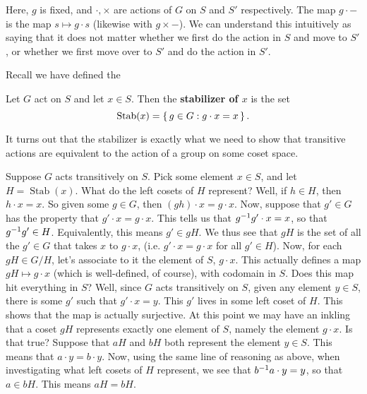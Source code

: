 \documentclass[./main.tex]{subfiles}
\begin{document}
Here, $g$ is fixed, and $\cdot, \times$ are actions of $G$ on $S$ and $S'$
respectively. The map $g \cdot -$ is the map $s \mapsto g \cdot s$ (likewise
with $g \times -$). We can understand this intuitively as saying that it does
not matter whether we first do the action in $S$ and move to $S'$, or whether we
first move over to $S'$ and do the action in $S'$.

Recall we have defined the
\begin{definition}
    Let $G$ act on $S$ and let $x \in S$. Then the \textbf{stabilizer of $x$} is the set 
    \[
        \operatorname{Stab}(x) = \set{ g \in G: g \cdot x = x}.
    \]
\end{definition}
It turns out that the stabilizer is exactly what we need to show that transitive
actions are equivalent to the action of a group on some coset space.

Suppose $G$ acts transitively on $S$. Pick some element $x \in S$, and let $H =
\operatorname{Stab}(x)$. What do the left cosets of $H$ represent? Well, if $h
\in H$, then $h \cdot x = x$. So given some $g \in G$, then $(gh) \cdot x = g
\cdot x$. Now, suppose that $g' \in G$ has the property that $g' \cdot x = g
\cdot x$. This tells us that $g^{-1} g' \cdot x = x$, so that $g^{-1} g' \in H$.
Equivalently, this means $g' \in gH$. We thus see that $gH$ is the set of all
the $g' \in G$ that takes $x$ to $g \cdot x$, (i.e. $g' \cdot x = g \cdot x$ for
all $g' \in H$). Now, for each $gH \in G/H$, let's associate to it the element
of $S$, $g \cdot x$. This actually defines a map $gH \mapsto g \cdot x$ (which
is well-defined, of course), with codomain in $S$. Does this map hit everything
in $S$? Well, since $G$ acts transitively on $S$, given any element $y \in S$,
there is some $g'$ such that $g' \cdot x = y$. This $g'$ lives in some left
coset of $H$. This shows that the map is actually surjective. At this point we
may have an inkling that a coset $gH$ represents exactly one element of $S$,
namely the element $g \cdot x$. Is that true? Suppose that $aH$ and $bH$ both
represent the element $y \in S$. This means that $a \cdot y = b \cdot y$. Now,
using the same line of reasoning as above, when investigating what left cosets
of $H$ represent, we see that $b^{-1} a \cdot y = y$, so that $a \in bH$. This
means $aH = bH$.
\end{document}
